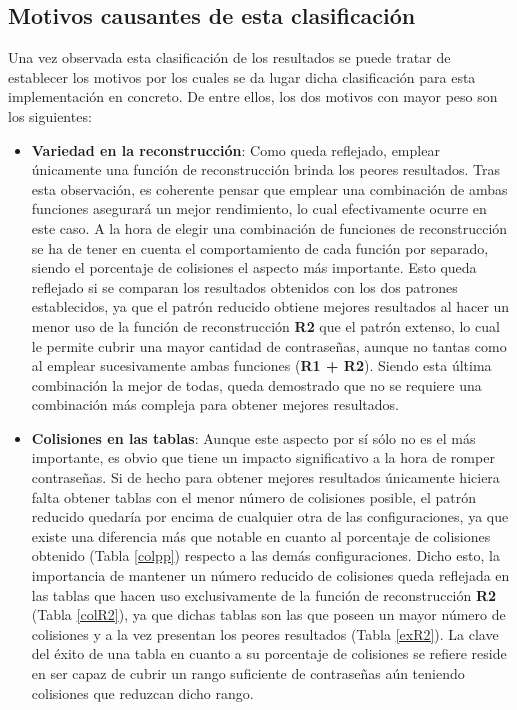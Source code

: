 \documentclass[12pt,spanish,listoffigures,listoftables,listofalgorithms]{tfgetsinf}
\begin{document}
\subsection{Motivos causantes de esta clasificación}

Una vez observada esta clasificación de los resultados se puede tratar de establecer los motivos por los cuales se da lugar dicha clasificación para esta implementación en concreto. De entre ellos, los dos motivos con mayor peso son los siguientes:

\begin{itemize}

    \item \textbf{Variedad en la reconstrucción}: Como queda reflejado, emplear únicamente una función de reconstrucción brinda los peores resultados. Tras esta observación, es coherente pensar que emplear una combinación de ambas funciones asegurará un mejor rendimiento, lo cual efectivamente ocurre en este caso. A la hora de elegir una combinación de funciones de reconstrucción se ha de tener en cuenta el comportamiento de cada función por separado, siendo el porcentaje de colisiones el aspecto más importante. Esto queda reflejado si se comparan los resultados obtenidos con los dos patrones establecidos, ya que el patrón reducido obtiene mejores resultados al hacer un menor uso de la función de reconstrucción \textbf{R2} que el patrón extenso, lo cual le permite cubrir una mayor cantidad de contraseñas, aunque no tantas como al emplear sucesivamente ambas funciones (\textbf{R1 + R2}). Siendo esta última combinación la mejor de todas, queda demostrado que no se requiere una combinación más compleja para obtener mejores resultados.
    
    \item \textbf{Colisiones en las tablas}: Aunque este aspecto por sí sólo no es el más importante, es obvio que tiene un impacto significativo a la hora de romper contraseñas. Si de hecho para obtener mejores resultados únicamente hiciera falta obtener tablas con el menor número de colisiones posible, el patrón reducido quedaría por encima de cualquier otra de las configuraciones, ya que existe una diferencia más que notable en cuanto al porcentaje de colisiones obtenido (Tabla \ref{colpp}) respecto a las demás configuraciones. Dicho esto, la importancia de mantener un número reducido de colisiones queda reflejada en las tablas que hacen uso exclusivamente de la función de reconstrucción \textbf{R2} (Tabla \ref{colR2}), ya que dichas tablas son las que poseen un mayor número de colisiones y a la vez presentan los peores resultados (Tabla \ref{exR2}). La clave del éxito de una tabla en cuanto a su porcentaje de colisiones se refiere reside en ser capaz de cubrir un rango suficiente de contraseñas aún teniendo colisiones que reduzcan dicho rango.
    
\end{itemize}
\end{document}
